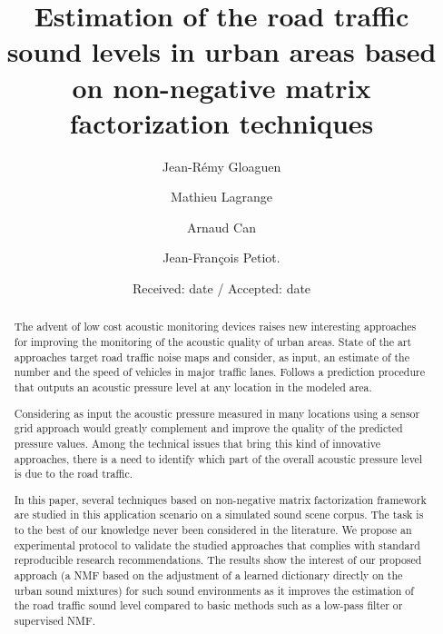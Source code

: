 \documentclass[twocolumn]{svjour3}          %
\begin{document}
\title{Estimation of the road traffic sound levels in urban areas based on non-negative matrix factorization techniques}

\author{Jean-R\'emy Gloaguen         \and
		Mathieu Lagrange \and
		Arnaud Can \and
		Jean-Fran\c cois Petiot.}


\date{Received: date / Accepted: date}


\maketitle

\begin{abstract}
The advent of low cost acoustic monitoring devices raises new interesting approaches for improving the monitoring of the acoustic quality of urban areas. State of the art approaches target road traffic noise maps and consider, as input, an estimate of the number and the speed of vehicles in major traffic lanes. Follows a prediction procedure that outputs an acoustic pressure level at any location in the modeled area.

Considering as input the acoustic pressure measured in many locations using a sensor grid approach would greatly complement and improve the quality of the predicted pressure values. Among the technical issues that bring this kind of innovative approaches, there is a need to identify which part of the overall acoustic pressure level is due to the road traffic.

In this paper, several techniques based on non-negative matrix  factorization framework are studied in this application scenario on a simulated sound scene corpus. The task is to the best of our knowledge never been considered in the literature. We propose an experimental protocol to validate the studied approaches that complies with standard reproducible research recommendations. The results show the interest of our proposed approach (a NMF based on the adjustment of a learned dictionary directly on the urban sound mixtures) for such sound environments as it improves the estimation of the road traffic sound level compared to basic methods such as a low-pass filter or supervised NMF.

\end{abstract}
\end{document}
